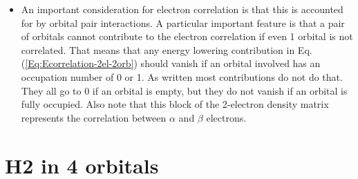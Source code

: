 \documentclass{amsart}
\begin{document}
\begin{itemize}
\begin{eqnarray}
\begin{matrix}
         \end{matrix}\right)
        \end{eqnarray}
\item An important consideration for electron correlation is that this is accounted for by orbital pair
         interactions. A particular important feature is that a pair of orbitals cannot contribute to the electron
         correlation if even 1 orbital is not correlated. That means that any energy lowering contribution in 
         Eq.(\ref{Eq:Ecorrelation-2el-2orb}) should vanish if an orbital involved has an occupation number
         of 0 or 1. As written most contributions do not do that. They all go to 0 if an orbital is empty, but
         they do not vanish if an orbital is fully occupied. Also note that this block of the 2-electron density 
         matrix represents the correlation between $\alpha$ and $\beta$ electrons.
\end{itemize}

\section{H2 in 4 orbitals}
\label{Subsect:h2-4orb}
\end{document}
